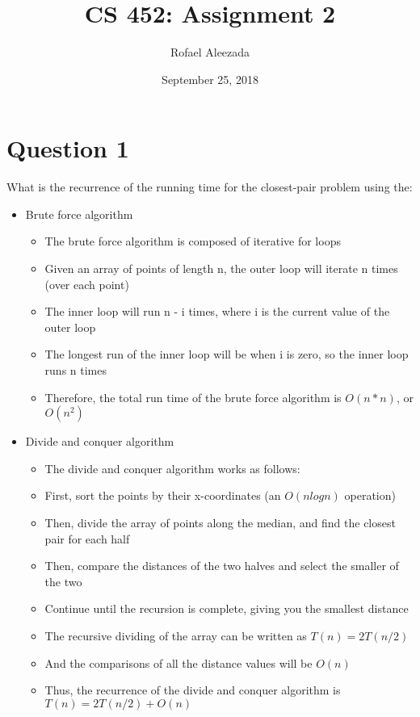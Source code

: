 \documentclass{article}
\title{CS 452: Assignment 2}
\date{September 25, 2018}
\author{Rofael Aleezada}
\begin{document}
    \maketitle

    \section{Question 1}
    What is the recurrence of the running time for the closest-pair problem using the:
    	\begin{itemize}
    		\item Brute force algorithm
    			\begin{itemize}
    				\item The brute force algorithm is composed of iterative for loops
    				\item Given an array of points of length n, the outer loop will iterate n times (over each point)
    				\item The inner loop will run n - i times, where i is the current value of the outer loop
    				\item The longest run of the inner loop will be when i is zero, so the inner loop runs n times
    				\item Therefore, the total run time of the brute force algorithm is $O(n*n)$, or $O(n^2)$
    			 \end{itemize}
    		\item Divide and conquer algorithm
    			\begin{itemize}
    				\item The divide and conquer algorithm works as follows:
    				\item First, sort the points by their x-coordinates (an $O(nlogn)$ operation)
    				\item Then, divide the array of points along the median, and find the closest pair for each half
    				\item Then, compare the distances of the two halves and select the smaller of the two 
    				\item Continue until the recursion is complete, giving you the smallest distance
    				\item The recursive dividing of the array can be written as $T(n) = 2T(n/2)$
    				\item And the comparisons of all the distance values will be $O(n)$    			
    				\item Thus, the recurrence of the divide and conquer algorithm is $T(n) = 2T(n/2) + O(n)$
    			\end{itemize}
    	\end{itemize}
    
\end{document}
